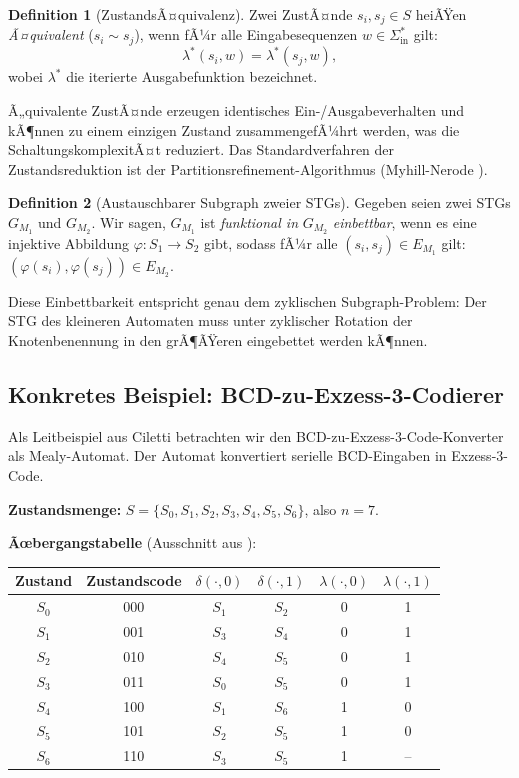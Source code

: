 ﻿\documentclass[a4paper,12pt]{article}
\theoremstyle{definition}
\newtheorem{definition}{Definition}
\begin{document}
\begin{definition}[ZustandsÃ¤quivalenz]
  Zwei ZustÃ¤nde $s_i, s_j \in S$ heiÃŸen \emph{Ã¤quivalent} ($s_i \sim s_j$), wenn fÃ¼r alle
  Eingabesequenzen $w \in \Sigma_{\text{in}}^*$ gilt:
  \[
    \lambda^*(s_i, w) = \lambda^*(s_j, w),
  \]
  wobei $\lambda^*$ die iterierte Ausgabefunktion bezeichnet.
\end{definition}

Ã„quivalente ZustÃ¤nde erzeugen identisches Ein-/Ausgabeverhalten und kÃ¶nnen zu einem
einzigen Zustand zusammengefÃ¼hrt werden, was die SchaltungskomplexitÃ¤t reduziert. Das
Standardverfahren der Zustandsreduktion ist der Partitionsrefinement-Algorithmus
(Myhill-Nerode \cite[S.~95]{ciletti2011}).

\begin{definition}[Austauschbarer Subgraph zweier STGs]
  Gegeben seien zwei STGs $G_{M_1}$ und $G_{M_2}$. Wir sagen, $G_{M_1}$ ist
  \emph{funktional in} $G_{M_2}$ \emph{einbettbar}, wenn es eine injektive Abbildung
  $\varphi: S_1 \to S_2$ gibt, sodass fÃ¼r alle $(s_i, s_j) \in E_{M_1}$ gilt:
  $(\varphi(s_i), \varphi(s_j)) \in E_{M_2}$.
\end{definition}

Diese Einbettbarkeit entspricht genau dem zyklischen Subgraph-Problem: Der STG des
kleineren Automaten muss unter zyklischer Rotation der Knotenbenennung in den grÃ¶ÃŸeren
eingebettet werden kÃ¶nnen.

\subsection{Konkretes Beispiel: BCD-zu-Exzess-3-Codierer}

Als Leitbeispiel aus Ciletti \cite[S.~84--98]{ciletti2011} betrachten wir den
BCD-zu-Exzess-3-Code-Konverter als Mealy-Automat. Der Automat konvertiert serielle
BCD-Eingaben in Exzess-3-Code.

\textbf{Zustandsmenge:} $S = \{S_0, S_1, S_2, S_3, S_4, S_5, S_6\}$, also $n = 7$.

\textbf{Ãœbergangstabelle} (Ausschnitt aus \cite[S.~85]{ciletti2011}):

\begin{center}
\begin{tabular}{cccccc}
  \toprule
  Zustand & Zustandscode & $\delta(\cdot, 0)$ & $\delta(\cdot, 1)$ & $\lambda(\cdot, 0)$ & $\lambda(\cdot, 1)$ \\
  \midrule
  $S_0$ & 000 & $S_1$ & $S_2$ & 0 & 1 \\
  $S_1$ & 001 & $S_3$ & $S_4$ & 0 & 1 \\
  $S_2$ & 010 & $S_4$ & $S_5$ & 0 & 1 \\
  $S_3$ & 011 & $S_0$ & $S_5$ & 0 & 1 \\
  $S_4$ & 100 & $S_1$ & $S_6$ & 1 & 0 \\
  $S_5$ & 101 & $S_2$ & $S_5$ & 1 & 0 \\
  $S_6$ & 110 & $S_3$ & $S_5$ & 1 & -- \\
  \bottomrule
\end{tabular}
\end{center}
\end{document}
